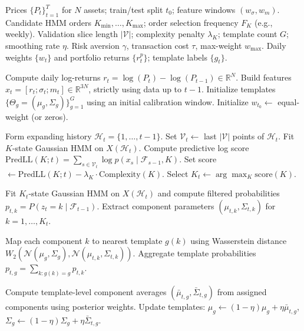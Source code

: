 \documentclass[11pt]{article}
\begin{document}
\begin{algorithm}[H]
\caption{Parametric Regime Detection + MVO (Strictly Causal, Predictive $K_t$, Template Tracking)}
\label{alg:parametric_templates}
\begin{algorithmic}[1]
\Require Prices $\{P_t\}_{t=1}^T$ for $N$ assets; train/test split $t_0$; feature windows $(w_\sigma,w_m)$.
\Require Candidate HMM orders $K_{\min},\dots,K_{\max}$; order selection frequency $F_K$ (e.g., weekly).
\Require Validation slice length $|\mathcal{V}|$; complexity penalty $\lambda_K$; template count $G$; smoothing rate $\eta$.
\Require Risk aversion $\gamma$, transaction cost $\tau$, max-weight $w_{\max}$.
\Ensure Daily weights $\{w_t\}$ and portfolio returns $\{r_t^p\}$; template labels $\{g_t\}$.

\State Compute daily log-returns $r_t=\log(P_t)-\log(P_{t-1})\in\mathbb{R}^N$.
\State Build features $x_t=[r_t;\sigma_t;m_t]\in\mathbb{R}^{3N}$, strictly using data up to $t-1$.
\State Initialize templates $\{\Theta_g=(\mu_g,\Sigma_g)\}_{g=1}^G$ using an initial calibration window.
\State Initialize $w_{t_0}\leftarrow$ equal-weight (or zeros).

    \State Form expanding history $\mathcal{H}_t=\{1,\dots,t-1\}$.
        \State Set $\mathcal{V}_t \leftarrow$ last $|\mathcal{V}|$ points of $\mathcal{H}_t$.
            \State Fit $K$-state Gaussian HMM on $X(\mathcal{H}_t)$.
            \State Compute predictive log score $\text{PredLL}(K;t)=\sum_{s\in\mathcal{V}_t}\log p(x_s\mid\mathcal{F}_{s-1},K)$.
            \State Set score $\leftarrow \text{PredLL}(K;t)-\lambda_K\cdot \text{Complexity}(K)$.
        \EndFor
        \State Select $K_t \leftarrow \arg\max_K \text{score}(K)$.
    \EndIf

    \State Fit $K_t$-state Gaussian HMM on $X(\mathcal{H}_t)$ and compute filtered probabilities $p_{t,k}=P(z_t=k\mid\mathcal{F}_{t-1})$.
    \State Extract component parameters $(\mu_{t,k},\Sigma_{t,k})$ for $k=1,\dots,K_t$.

    \State Map each component $k$ to nearest template $g(k)$ using Wasserstein distance $W_2(\mathcal{N}(\mu_g,\Sigma_g),\mathcal{N}(\mu_{t,k},\Sigma_{t,k}))$.
    \State Aggregate template probabilities $p_{t,g}=\sum_{k:g(k)=g}p_{t,k}$.

    \State Compute template-level component averages $(\bar\mu_{t,g},\bar\Sigma_{t,g})$ from assigned components using posterior weights.
    \State Update templates: $\mu_g\leftarrow(1-\eta)\mu_g+\eta\bar\mu_{t,g}$, $\Sigma_g\leftarrow(1-\eta)\Sigma_g+\eta\bar\Sigma_{t,g}$.


\end{algorithmic}
\end{algorithm}
\end{document}
